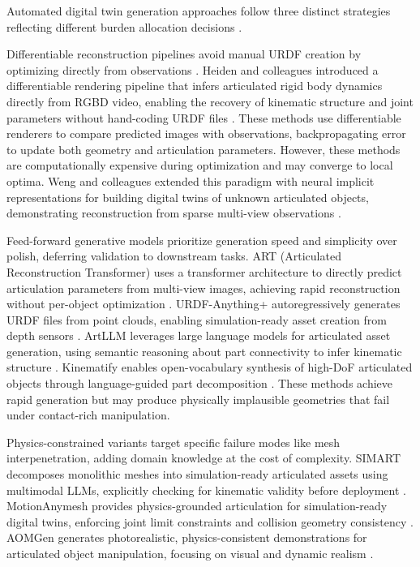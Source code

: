 \documentclass[12pt,a4paper,oneside]{report}
\begin{document}
Automated digital twin generation approaches follow three distinct strategies reflecting different burden allocation decisions \cite{heiden2022inferring, weng2024neural, li2025art}.

Differentiable reconstruction pipelines avoid manual URDF creation by optimizing directly from observations \cite{heiden2022inferring, weng2024neural}. Heiden and colleagues introduced a differentiable rendering pipeline that infers articulated rigid body dynamics directly from RGBD video, enabling the recovery of kinematic structure and joint parameters without hand-coding URDF files \cite{heiden2022inferring}. These methods use differentiable renderers to compare predicted images with observations, backpropagating error to update both geometry and articulation parameters. However, these methods are computationally expensive during optimization and may converge to local optima. Weng and colleagues extended this paradigm with neural implicit representations for building digital twins of unknown articulated objects, demonstrating reconstruction from sparse multi-view observations \cite{weng2024neural}.

Feed-forward generative models prioritize generation speed and simplicity over polish, deferring validation to downstream tasks. ART (Articulated Reconstruction Transformer) uses a transformer architecture to directly predict articulation parameters from multi-view images, achieving rapid reconstruction without per-object optimization \cite{li2025art}. URDF-Anything+ autoregressively generates URDF files from point clouds, enabling simulation-ready asset creation from depth sensors \cite{wu2025urdfanything}. ArtLLM leverages large language models for articulated asset generation, using semantic reasoning about part connectivity to infer kinematic structure \cite{wang2025artllm}. Kinematify enables open-vocabulary synthesis of high-DoF articulated objects through language-guided part decomposition \cite{wang2025kinematify}. These methods achieve rapid generation but may produce physically implausible geometries that fail under contact-rich manipulation.

Physics-constrained variants target specific failure modes like mesh interpenetration, adding domain knowledge at the cost of complexity. SIMART decomposes monolithic meshes into simulation-ready articulated assets using multimodal LLMs, explicitly checking for kinematic validity before deployment \cite{zhang2025simart}. MotionAnymesh provides physics-grounded articulation for simulation-ready digital twins, enforcing joint limit constraints and collision geometry consistency \cite{xu2025motionanymesh}. AOMGen generates photorealistic, physics-consistent demonstrations for articulated object manipulation, focusing on visual and dynamic realism \cite{wu2024aomgen}.
\end{document}
